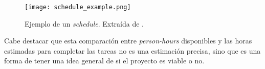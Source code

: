 %
\begin{figure}[h]
    \centering
    \texttt{[image: schedule\_example.png]}
    \caption{Ejemplo de un \textit{schedule}. Extraída de \cite{lemarchandPlayfulProductionProcess2021}.}
    \label{fig:x schedule ejemplo}
\end{figure}
%
\par Cabe destacar que esta comparación entre \textit{person-hours} disponibles y las horas estimadas para completar las tareas no es una estimación precisa, sino que es una forma de tener una idea general de si el proyecto es viable o no.

